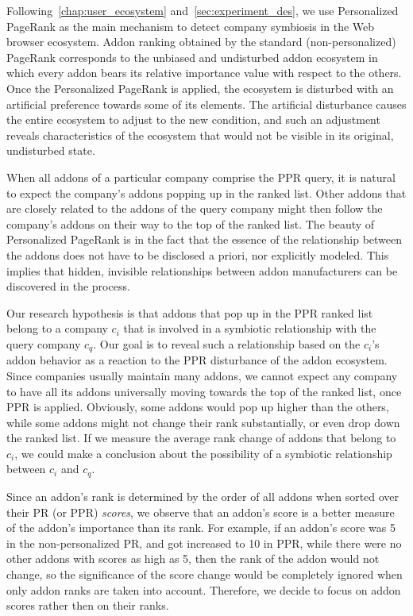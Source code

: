 \documentclass[ijoc,nonblindrev]{informs3} %
\numberwithin{equation}{subsection}
\begin{document}
Following~\autoref{chap:user_ecosystem} and~\autoref{sec:experiment_des}, we use Personalized PageRank as the main mechanism to detect company symbiosis in the Web browser ecosystem. Addon ranking obtained by the standard (non-personalized) PageRank corresponds to the unbiased and undisturbed addon ecosystem in which every addon bears its relative importance value with respect to the others. Once the Personalized PageRank is applied, the ecosystem is disturbed with an artificial preference towards some of its elements. The artificial disturbance causes the entire ecosystem to adjust to the new condition, and such an adjustment reveals characteristics of the ecosystem that would not be visible in its original, undisturbed state. 

When all addons of a particular company comprise the PPR query, it is natural to expect the company's addons popping up in the ranked list. Other addons that are closely related to the addons of the query company might then follow the company's addons on their way to the top of the ranked list. The beauty of Personalized PageRank is in the fact that the essence of the relationship between the addons does not have to be disclosed a priori, nor explicitly modeled. This implies that hidden, invisible relationships between addon manufacturers can be discovered in the process.

Our research hypothesis is that addons that pop up in the PPR ranked list belong to a company $c_i$ that is involved in a symbiotic relationship with the query company $c_q$. Our goal is to reveal such a relationship based on the $c_i$'s addon behavior as a reaction to the PPR disturbance of the addon ecosystem. Since companies usually maintain many addons, we cannot expect any company to have all its addons universally moving towards the top of the ranked list, once PPR is applied. Obviously, some addons would pop up higher than the others, while some addons might not change their rank substantially, or even drop down the ranked list. If we measure the average rank change of addons that belong to $c_i$, we could make a conclusion about the possibility of a symbiotic relationship between $c_i$ and $c_q$. 

Since an addon's rank is determined by the order of all addons when sorted over their PR (or PPR) \emph{scores}, we observe that an addon's score is a better measure of the addon's importance than its rank. For example, if an addon's score was 5 in the non-personalized PR, and got increased to 10 in PPR, while there were no other addons with scores as high as 5, then the rank of the addon would not change, so the significance of the score change would be completely ignored when only addon ranks are taken into account. Therefore, we decide to focus on addon scores rather then on their ranks. 
\end{document}

